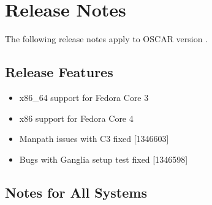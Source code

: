 %
%
%


\section{Release Notes}
\label{sec:release-notes}

The following release notes apply to OSCAR version \oscarversion.
\subsection{Release Features}
\label{subsec:release-features}

\begin{itemize}

\item x86\_64 support for Fedora Core 3
\item x86 support for Fedora Core 4
\item Manpath issues with C3 fixed [1346603]
\item Bugs with Ganglia setup test fixed [1346598]

\end{itemize}

\subsection{Notes for All Systems}
\label{subsec:release-notes}


